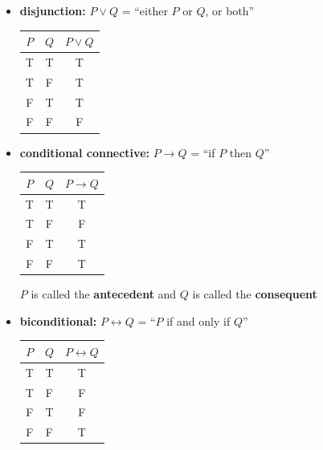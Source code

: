 \documentclass[11pt,twoside]{report}
\begin{document}
\begin{itemize}
\begin{itemize}
\item  \textbf{disjunction:}  $P \vee Q $ = ``either $P$ or $Q$,  or both'' 


  \begin{center}
  \begin{tabular}{|c|c|c|}
  \hline
  $P$ & $Q$ & $P \vee Q$ \\
  \hline
  T & T & T \\
  T & F & T \\
  F & T & T  \\
  F & F & F \\
  \hline
  \end{tabular}
  \end{center} 
  
  

\item  \textbf{conditional connective:}  $P \to Q$ = ``if $P$ then $Q$'' 

  \begin{center}
  \begin{tabular}{|c|c|c|}
  \hline
  $P$ & $Q$ & $P \to  Q$ \\
  \hline
  T & T & T \\
  T & F & F \\
  F & T & T  \\
  F & F & T \\
  \hline
  \end{tabular}
  \end{center} 
 $P$ is called the \textbf{antecedent} and $Q$ is called the \textbf{consequent}

\item  \textbf{biconditional:}  $P \leftrightarrow Q$ = ``$P$ if and only if  $Q$'' 

  \begin{center}
  \begin{tabular}{|c|c|c|}
  \hline
  $P$ & $Q$ & $P  \leftrightarrow   Q$ \\
  \hline
  T & T & T \\
  T & F & F \\
  F & T & F  \\
  F & F & T \\
  \hline
  \end{tabular}
  \end{center} 
\end{itemize}



\end{itemize}
\end{document}
